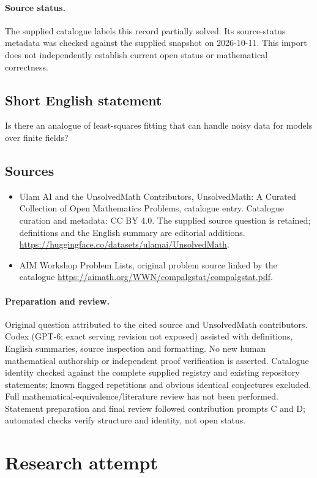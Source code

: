 \documentclass[11pt]{article}
\begin{document}
\paragraph{Source status.}
The supplied catalogue labels this record partially solved. Its source-status metadata was checked against the supplied snapshot on 2026-10-11. This import does not independently establish current open status or mathematical correctness.
\subsection{Short English statement}
Is there an analogue of least-squares fitting that can handle noisy data for models over finite fields?
\subsection{Sources}
\begin{itemize}
\item[S1] Ulam AI and the UnsolvedMath Contributors, UnsolvedMath: A Curated Collection of Open Mathematics Problems, catalogue entry. Catalogue curation and metadata: CC BY 4.0. The supplied source question is retained; definitions and the English summary are editorial additions.
\url{https://huggingface.co/datasets/ulamai/UnsolvedMath}.
\item[S2] AIM Workshop Problem Lists, original problem source linked by the catalogue
\url{https://aimath.org/WWN/compalgstat/compalgstat.pdf}.
\end{itemize}
\paragraph{Preparation and review.}
Original question attributed to the cited source and UnsolvedMath contributors. Codex (GPT-6; exact serving revision not exposed) assisted with definitions, English summaries, source inspection and formatting. No new human mathematical authorship or independent proof verification is asserted. Catalogue identity checked against the complete supplied registry and existing repository statements; known flagged repetitions and obvious identical conjectures excluded. Full mathematical-equivalence/literature review has not been performed. Statement preparation and final review followed contribution prompts C and D; automated checks verify structure and identity, not open status.
\label{end:statement}


\section{Research attempt}
\end{document}
